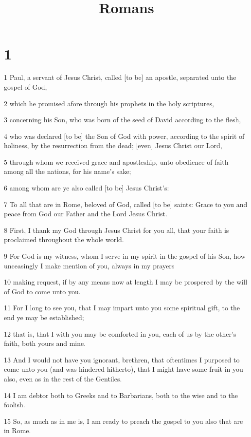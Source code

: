 

\title{Romans}

\chapter{1}

\par 1 Paul, a servant of Jesus Christ, called [to be] an apostle, separated unto the gospel of God,
\par 2 which he promised afore through his prophets in the holy scriptures,
\par 3 concerning his Son, who was born of the seed of David according to the flesh,
\par 4 who was declared [to be] the Son of God with power, according to the spirit of holiness, by the resurrection from the dead; [even] Jesus Christ our Lord,
\par 5 through whom we received grace and apostleship, unto obedience of faith among all the nations, for his name's sake;
\par 6 among whom are ye also called [to be] Jesus Christ's:
\par 7 To all that are in Rome, beloved of God, called [to be] saints: Grace to you and peace from God our Father and the Lord Jesus Christ.
\par 8 First, I thank my God through Jesus Christ for you all, that your faith is proclaimed throughout the whole world.
\par 9 For God is my witness, whom I serve in my spirit in the gospel of his Son, how unceasingly I make mention of you, always in my prayers
\par 10 making request, if by any means now at length I may be prospered by the will of God to come unto you.
\par 11 For I long to see you, that I may impart unto you some spiritual gift, to the end ye may be established;
\par 12 that is, that I with you may be comforted in you, each of us by the other's faith, both yours and mine.
\par 13 And I would not have you ignorant, brethren, that oftentimes I purposed to come unto you (and was hindered hitherto), that I might have some fruit in you also, even as in the rest of the Gentiles.
\par 14 I am debtor both to Greeks and to Barbarians, both to the wise and to the foolish.
\par 15 So, as much as in me is, I am ready to preach the gospel to you also that are in Rome.
